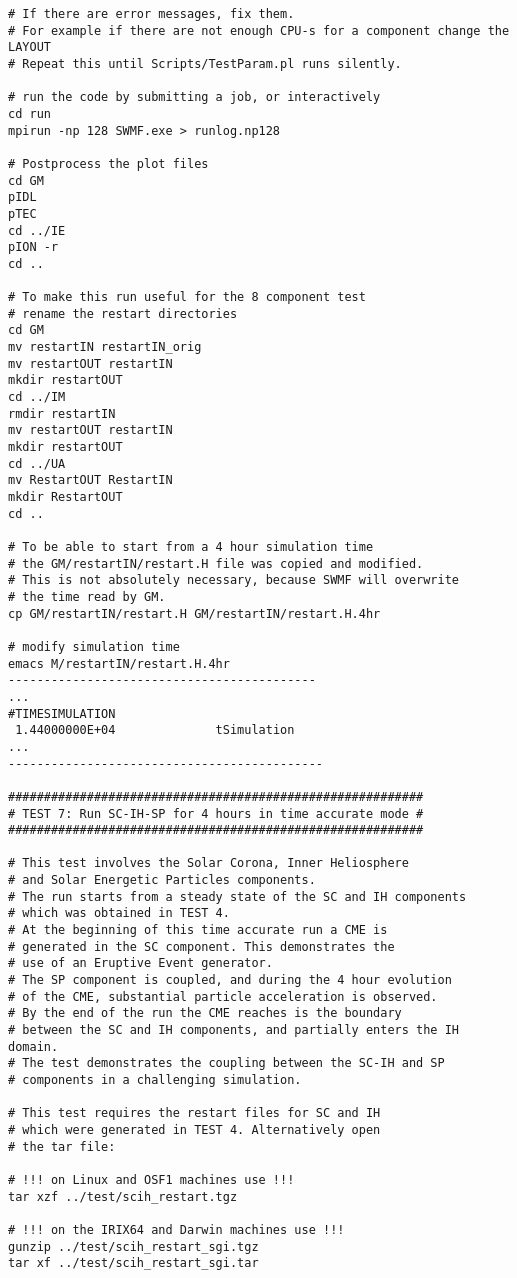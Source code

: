 \begin{verbatim}
# If there are error messages, fix them. 
# For example if there are not enough CPU-s for a component change the LAYOUT
# Repeat this until Scripts/TestParam.pl runs silently.

# run the code by submitting a job, or interactively
cd run
mpirun -np 128 SWMF.exe > runlog.np128

# Postprocess the plot files
cd GM
pIDL
pTEC
cd ../IE
pION -r
cd ..

# To make this run useful for the 8 component test 
# rename the restart directories
cd GM
mv restartIN restartIN_orig
mv restartOUT restartIN
mkdir restartOUT
cd ../IM
rmdir restartIN
mv restartOUT restartIN
mkdir restartOUT
cd ../UA
mv RestartOUT RestartIN
mkdir RestartOUT
cd ..

# To be able to start from a 4 hour simulation time
# the GM/restartIN/restart.H file was copied and modified.
# This is not absolutely necessary, because SWMF will overwrite
# the time read by GM.
cp GM/restartIN/restart.H GM/restartIN/restart.H.4hr

# modify simulation time
emacs M/restartIN/restart.H.4hr
-------------------------------------------
...
#TIMESIMULATION
 1.44000000E+04              tSimulation
...
--------------------------------------------

##########################################################
# TEST 7: Run SC-IH-SP for 4 hours in time accurate mode #
##########################################################

# This test involves the Solar Corona, Inner Heliosphere
# and Solar Energetic Particles components.
# The run starts from a steady state of the SC and IH components
# which was obtained in TEST 4.
# At the beginning of this time accurate run a CME is 
# generated in the SC component. This demonstrates the
# use of an Eruptive Event generator.
# The SP component is coupled, and during the 4 hour evolution
# of the CME, substantial particle acceleration is observed. 
# By the end of the run the CME reaches is the boundary 
# between the SC and IH components, and partially enters the IH domain.
# The test demonstrates the coupling between the SC-IH and SP
# components in a challenging simulation.

# This test requires the restart files for SC and IH
# which were generated in TEST 4. Alternatively open
# the tar file:

# !!! on Linux and OSF1 machines use !!!
tar xzf ../test/scih_restart.tgz

# !!! on the IRIX64 and Darwin machines use !!!
gunzip ../test/scih_restart_sgi.tgz
tar xf ../test/scih_restart_sgi.tar


\end{verbatim}
